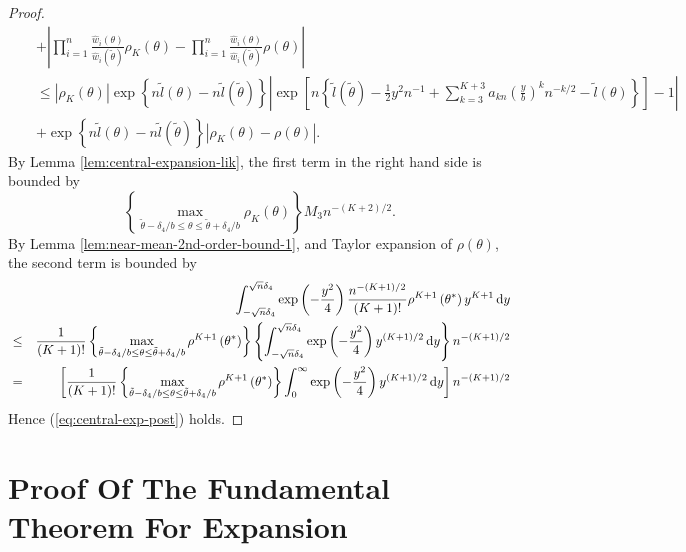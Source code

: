 \begin{proof}
\begin{eqnarray*}
 &  & +\left|\prod_{i=1}^{n}\frac{\hat{w}_{i}\left(\theta\right)}{\hat{w}_{i}\left(\tilde{\theta}\right)}\rho_{K}\left(\theta\right)-\prod_{i=1}^{n}\frac{\hat{w}_{i}\left(\theta\right)}{\hat{w}_{i}\left(\tilde{\theta}\right)}\rho\left(\theta\right)\right|\\
 &  & \le\left|\rho_{K}\left(\theta\right)\right|\exp\left\{ n\tilde{l}\left(\theta\right)-n\tilde{l}\left(\tilde{\theta}\right)\right\} \left|\exp\left[n\left\{ \tilde{l}\left(\tilde{\theta}\right)-\frac{1}{2}y^{2}n^{-1}+\sum_{k=3}^{K+3}a_{kn}\left(\frac{y}{b}\right)^{k}n^{-k/2}-\tilde{l}\left(\theta\right)\right\} \right]-1\right|\\
 &  & +\exp\left\{ n\tilde{l}\left(\theta\right)-n\tilde{l}\left(\tilde{\theta}\right)\right\} \left|\rho_{K}\left(\theta\right)-\rho\left(\theta\right)\right|.
\end{eqnarray*}
 By Lemma \ref{lem:central-expansion-lik}, the first term in the
right hand side is bounded by 
\[
\left\{ \max_{\tilde{\theta}-\delta_{4}/b\le\theta\le\tilde{\theta}+\delta_{4}/b}\rho_{K}\left(\theta\right)\right\} M_{3}n^{-\left(K+2\right)/2}.
\]
By Lemma \ref{lem:near-mean-2nd-order-bound-1}, and Taylor expansion
of $\rho\left(\theta\right)$, the second term is bounded by 
\begin{eqnarray*}
 &  & \int_{-\sqrt{n}\delta_{4}}^{\sqrt{n}\delta_{4}}\exp\left(-\frac{y^{2}}{4}\right)\frac{n^{-\left(K+1\right)/2}}{\left(K+1\right)!}\rho^{K+1}\left(\theta^{*}\right)y^{K+1}\,\mathrm{d} y\\
 & \le & \frac{1}{\left(K+1\right)!}\left\{ \max_{\tilde{\theta}-\delta_{4}/b\le\theta\le\tilde{\theta}+\delta_{4}/b}\rho^{K+1}\left(\theta^{*}\right)\right\} \left\{ \int_{-\sqrt{n}\delta_{4}}^{\sqrt{n}\delta_{4}}\exp\left(-\frac{y^{2}}{4}\right)y^{\left(K+1\right)/2}\,\mathrm{d} y\right\} n^{-\left(K+1\right)/2}\\
 & = & \left[\frac{1}{\left(K+1\right)!}\left\{ \max_{\tilde{\theta}-\delta_{4}/b\le\theta\le\tilde{\theta}+\delta_{4}/b}\rho^{K+1}\left(\theta^{*}\right)\right\} \int_{0}^{\infty}\exp\left(-\frac{y^{2}}{4}\right)y^{\left(K+1\right)/2}\,\mathrm{d} y\right]n^{-\left(K+1\right)/2}
\end{eqnarray*}
Hence (\ref{eq:central-exp-post}) holds. %
\begin{comment}
add some constant for the bound of rho
\end{comment}

\end{proof}

\section{Proof Of The Fundamental Theorem For Expansion}\label{app-proof-fun-thm}

